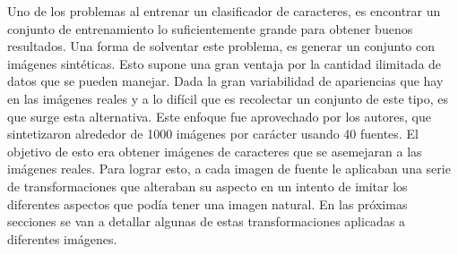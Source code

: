 	Uno de los problemas al entrenar un clasificador de caracteres, es encontrar un conjunto de entrenamiento lo suficientemente grande para obtener buenos resultados. Una forma de solventar este problema, es generar un conjunto con imágenes sintéticas. Esto supone una gran ventaja por la cantidad ilimitada de datos que se pueden manejar. Dada la gran variabilidad de apariencias que hay en las imágenes reales y a lo difícil que es recolectar un conjunto de este tipo, es que surge esta alternativa. Este enfoque fue aprovechado por los autores, que sintetizaron alrededor de 1000 imágenes por carácter usando 40 fuentes. El objetivo de esto era obtener imágenes de caracteres que se asemejaran a las imágenes reales. Para lograr esto, a cada imagen de fuente le aplicaban una serie de transformaciones que alteraban su aspecto en un intento de imitar los diferentes aspectos que podía tener una imagen natural. En las próximas secciones se van a detallar algunas de estas transformaciones aplicadas a diferentes imágenes.
	

